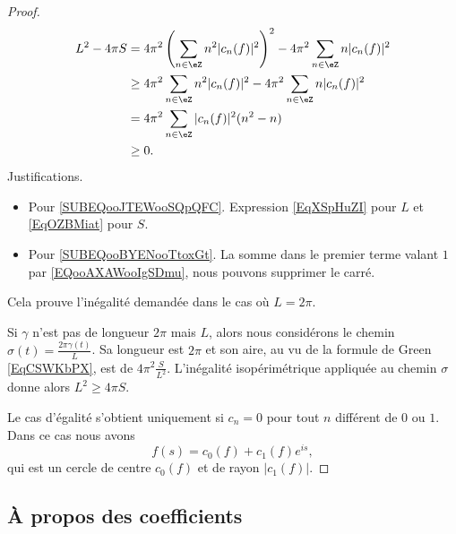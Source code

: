 \begin{proof}
	\begin{subequations}
		\begin{align}
			L^2-4\pi S & =4\pi^2\left( \sum_{n\in \eZ}n^2| c_n(f) |^2 \right)^2-4\pi^2\sum_{n\in \eZ}n| c_n(f) |^2       \label{SUBEQooJTEWooSQpQFC} \\
			           & \geq 4\pi^2\sum_{n\in \eZ}n^2| c_n(f) |^2-4\pi^2\sum_{n\in \eZ}n| c_n(f) |^2      \label{SUBEQooBYENooTtoxGt}               \\
			           & =4\pi^2\sum_{n\in \eZ}| c_n(f) |^2(n^2-n)                                                                                   \\
			           & \geq 0.
		\end{align}
	\end{subequations}
	Justifications.
	\begin{itemize}
		\item Pour \eqref{SUBEQooJTEWooSQpQFC}. Expression \eqref{EqXSpHuZI} pour \( L\) et \eqref{EqOZBMiat} pour \( S\).
		\item Pour \eqref{SUBEQooBYENooTtoxGt}. La somme dans le premier terme valant \( 1\) par \eqref{EQooAXAWooIgSDmu}, nous pouvons supprimer le carré.
	\end{itemize}
	Cela prouve l'inégalité demandée dans le cas où \( L=2\pi\).

	Si \( \gamma\) n'est pas de longueur \( 2\pi\) mais \( L\), alors nous considérons le chemin \( \sigma(t)=\frac{ 2\pi\gamma(t) }{ L }\). Sa longueur est \( 2\pi\) et son aire, au vu de la formule de Green \eqref{EqCSWKbPX}, est de \( 4\pi^2\frac{ S }{ L^2 }\). L'inégalité isopérimétrique appliquée au chemin \( \sigma\) donne alors \( L^2\geq 4\pi S\).

	Le cas d'égalité s'obtient uniquement si \( c_n=0\) pour tout \( n\) différent de \( 0\) ou \( 1\). Dans ce cas nous avons
	\begin{equation}
		f(s)=c_0(f)+c_1(f) e^{is},
	\end{equation}
	qui est un cercle de centre \( c_0(f)\) et de rayon \( | c_1(f) |\).
\end{proof}

\subsection{À propos des coefficients}

